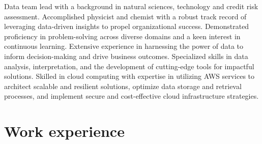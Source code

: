 \documentclass[11pt, letterpaper, sans]{moderncv}        %
\begin{document}
\maketitle

\small{
Data team lead with a background in natural sciences, technology and credit risk assessment. Accomplished physicist and chemist with a robust track record of leveraging data-driven insights to propel organizational success. Demonstrated proficiency in problem-solving across diverse domains and a keen interest in continuous learning. Extensive experience in harnessing the power of data to inform decision-making and drive business outcomes. Specialized skills in data analysis, interpretation, and the development of cutting-edge tools for impactful solutions. Skilled in cloud computing with expertise in utilizing AWS services to architect scalable and resilient solutions, optimize data storage and retrieval processes, and implement secure and cost-effective cloud infrastructure strategies.
}

\section{Work experience}
\end{document}
